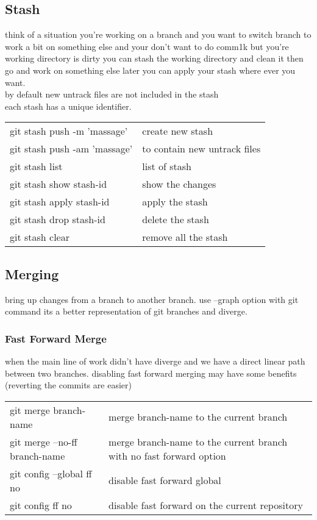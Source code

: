 \documentclass{article}
\begin{document}
	\subsection{Stash}
		think of a situation you're working on a branch and you want to switch branch to work a bit on something else and your don't want to do comm1k but you're working directory is dirty you can stash the working directory and clean it then go and work on something else later you can apply your stash where ever you want.\\
		by default new untrack files are not included in the stash \\
		each stash has a unique identifier.\\
		\begin{tabular}{l l}
			git stash push -m 'massage'  & create new stash             \\
			git stash push -am 'massage' & to contain new untrack files \\
			git stash list               & list of stash                \\
			git stash show stash-id      & show the changes             \\
			git stash apply stash-id     & apply the stash              \\
			git stash drop stash-id      & delete the stash             \\
			git stash clear              & remove all the stash
		\end{tabular}
	
	\subsection{Merging}
		bring up changes from a branch to another branch.
		use --graph option with git command its a better representation of git branches and diverge.
		
		\subsubsection{Fast Forward Merge}
			when the main line of work didn't have diverge and we have a direct linear path between two branches.
			disabling fast forward merging may have some benefits (reverting the commits are easier)\\
			\begin{tabular}{l l}
				git merge branch-name         & merge branch-name to the current branch                             \\
				git merge --no-ff branch-name & merge branch-name to the current branch with no fast forward option \\
				git config --global ff no     & disable fast forward global                                         \\
				git config ff no              & disable fast forward on the current repository
			\end{tabular}
\end{document}
